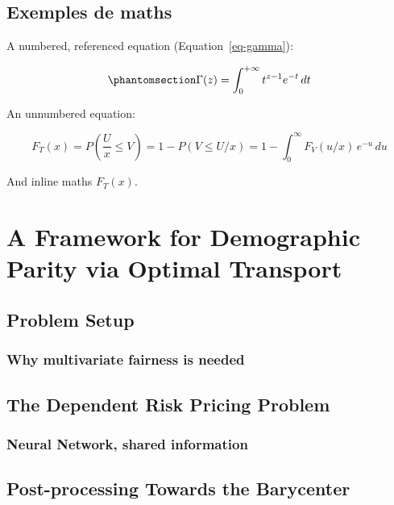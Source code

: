 \documentclass[
  a4paper,
  11pt,
  a4paper,
  twoside,
  openright]{report}
\begin{document}
\section{Exemples de maths}\label{exemples-de-maths}

A numbered, referenced equation (Equation~\ref{eq-gamma}):

\begin{equation}\protect\phantomsection\label{eq-gamma}{
\Gamma(z) = \int_0^{+\infty} t^{z-1}e^{-t}\,dt
}\end{equation}

An unnumbered equation:

\[
F_T(x) = P\!\left(\frac{U}{x} \leq V \right)
= 1 - P(V \leq U/x)
= 1 - \int_0^\infty F_V(u/x)\, e^{-u}\, du
\]

And inline maths \(F_T(x)\).


\chapter{A Framework for Demographic Parity via Optimal
Transport}\label{a-framework-for-demographic-parity-via-optimal-transport}

\section{Problem Setup}\label{problem-setup}

\subsection{Why multivariate fairness is
needed}\label{why-multivariate-fairness-is-needed}

\section{The Dependent Risk Pricing
Problem}\label{the-dependent-risk-pricing-problem}

\subsection{Neural Network, shared
information}\label{neural-network-shared-information}

\section{Post-processing Towards the
Barycenter}\label{post-processing-towards-the-barycenter}
\end{document}
